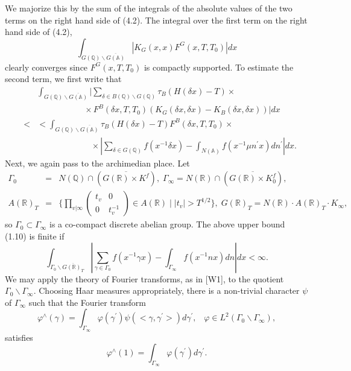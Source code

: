 We majorize this by the sum of the integrals of the absolute values of the
two terms on the right hand side of (4.2). The integral over the first term
on the right hand side of (4.2), 
\[
\int_{G({\mathbb{Q}})\backslash \overline{G({\mathbb{A}})}}|K_G(x,x)F^G(x,T,T_0)|dx 
\]
clearly converges since $F^G(x,T,T_0)$ is compactly supported. To estimate
the second term, we first write that 
\begin{eqnarray}
&&\int_{G({\mathbb{Q}})\backslash \overline{G({\mathbb{A}})}}|
\sum_{\delta \in B({\mathbb{Q}})\backslash G({\mathbb{Q}})}
\tau _B(H(\delta x)-T)\times \\
&&\;\;\;\;\;\;\;\;\;\;\;\;\;\;\;\;\;\;\;\;\times F^B(\delta
x,T,T_0)(K_G(\delta x,\delta x)-K_B(\delta x,\delta x))|dx \\
&<&<\int_{G({\mathbb{Q}})\backslash \overline{G({\mathbb{A}})}}
\tau _B(H(\delta x)-T)F^B(\delta x,T,T_0)\times  \nonumber \\
&&\;\;\;\;\;\;\;\;\;\;\;\;\;\;\;\;\;\;\;\;\;\;\;\times
|\sum_{\delta \in G({\mathbb{Q}})}f(x^{-1}\delta x)
-\int_{N({\mathbb{A}})}f(x^{-1}\mu n^{\prime }x)dn^{\prime }|dx.
\end{eqnarray}
Next, we again pass to the archimedian place. Let 
\begin{eqnarray}
\Gamma _0 &=&N({\mathbb{Q}})\cap (\overline{G({\mathbb{R}})\times K^f}),
\;\Gamma_\infty
=N({\mathbb{R}})\cap (\overline{G({\mathbb{R}})\times K_0^f}),\; \\
A({\mathbb{R}})_T &=&\{\prod_{v|\infty}
\left( 
\begin{array}{cc}
t_v & 0 \\ 
0 & t_v^{-1}
\end{array}
\right) \in A({\mathbb{R}})\;|\;|t_v|>T^{1/2}\},
\;G({\mathbb{R}})_T=N({\mathbb{R}})\cdot A({\mathbb{R}})_T\cdot K_\infty ,  
\nonumber
\end{eqnarray}
so $\Gamma _0\subset \Gamma _\infty $ is a co-compact discrete abelian
group. The above upper bound (1.10) is finite if 
\begin{equation}
\int_{\Gamma _0\backslash \overline{G({\mathbb{R}})_T}}|\sum_{\gamma \in \Gamma
_0}f(x^{-1}\gamma x)-\int_{\Gamma _\infty }f(x^{-1}nx)dn|dx<\infty .
\end{equation}
We may apply the theory of Fourier transforms, as in [W1], to the 
quotient $\Gamma _0\backslash \Gamma _\infty $. 
Choosing Haar measures appropriately,
there is a non-trivial character 
$\psi $ of $\Gamma _\infty $ such that the Fourier transform 
\[
\varphi ^{\wedge }(\gamma )
=\int_{\Gamma _\infty }\varphi (\gamma ^{\prime})
\psi (<\gamma ,\gamma ^{\prime }>)d\gamma ^{\prime },
\;\;\;\varphi \in L^2(\Gamma _0\backslash \Gamma _\infty ), 
\]
satisfies 
\[
\varphi ^{\wedge }(1)=\int_{\Gamma _\infty }\varphi (\gamma ^{\prime
})d\gamma ^{\prime }. 
\]

